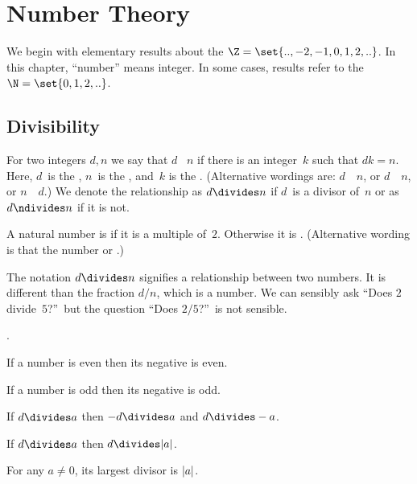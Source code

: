 \documentclass{ibl}
\begin{document}
\mainmatter
\pagestyle{bodypage}
\chapter{Number Theory}

We begin with elementary results about the
 $\Z=\set{..,-2,-1,0,1,2,..}$.
In this chapter, ``number'' means integer.
In some cases, results refer to the 
 $\N=\set{0,1,2,..}$.



\section{Divisibility}

\begin{df}
  For two integers $d,n$ we say that
  $d$ ~$n$
  if there is an integer~$k$ such that $dk=n$.
  Here, $d$~is the , 
  $n$~is the ,
  and~$k$ is the .
  (Alternative wordings are:
  $d$~~$n$,
  or $d$~~$n$,
  or $n$~~$d$.)
  We denote the relationship as
  $d\divides n$ if $d$~is a divisor of~$n$
  or as $d\ndivides n$ if it is not.
\end{df}

\begin{df}
  A natural number is  if it is a multiple of~$2$.
  Otherwise it is .
  (Alternative wording is that the number 
  or .)
\end{df}

  The notation $d\divides n$ signifies a relationship between two numbers.
  It is different than the fraction $d/n$, which is a number.
  We can sensibly ask ``Does $2$ divide~$5$?''\
  but the question ``Does $2/5$?''\ is not sensible.   

\begin{ex}
\pord.
\begin{exes}
\item If a number is even then its negative is even.
\item If a number is odd then its negative is odd.
\item If $d\divides a$ then $-d\divides a$ and $d\divides -a$.
\item If $d\divides a$ then $d\divides\absval{a}$.
\item For any $a\neq 0$, its largest divisor is $\lvert a\rvert$.
\end{exes}  
\end{ex}
\end{document}
